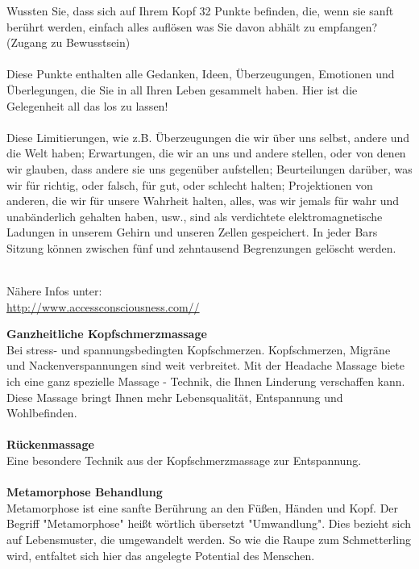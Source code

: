\documentclass[10pt,foldmark,notumble]{leaflet}
\begin{document}
Wussten Sie, dass sich auf Ihrem Kopf 32 Punkte befinden, die, wenn sie sanft berührt werden, einfach alles auflösen was Sie davon abhält zu empfangen? (Zugang zu Bewusstsein)\\
\\
Diese Punkte enthalten alle Gedanken, Ideen, Überzeugungen, Emotionen und Überlegungen, die Sie in all Ihren Leben gesammelt haben. Hier ist die Gelegenheit all das los zu lassen!\\
\\
Diese Limitierungen, wie z.B. Überzeugungen die wir über uns selbst, andere und die Welt haben; Erwartungen, die wir an uns und andere stellen, oder von denen wir glauben, dass andere sie uns gegenüber aufstellen; Beurteilungen darüber, was wir für richtig, oder falsch, für gut, oder schlecht halten; Projektionen von anderen, die wir für unsere Wahrheit halten, alles, was wir jemals für wahr und unabänderlich gehalten haben, usw., sind als verdichtete elektromagnetische Ladungen in unserem Gehirn und unseren Zellen gespeichert. In jeder Bars Sitzung können zwischen fünf und zehntausend Begrenzungen gelöscht werden.\\
\\
\vfill
\begin{center}
Nähere Infos unter:\\
{\url{http://www.accessconsciousness.com//}} \\
\end{center}
\vfill
\newpage
{\large \bf Ganzheitliche Kopfschmerzmassage}\\
Bei stress- und spannungsbedingten Kopfschmerzen. 
Kopfschmerzen, Migräne und Nackenverspannungen sind weit verbreitet. Mit der Headache Massage biete ich eine ganz spezielle Massage - Technik, die Ihnen Linderung verschaffen kann. Diese Massage bringt Ihnen mehr Lebensqualität, Entspannung und Wohlbefinden. \\
\\
{\large \bf Rückenmassage}\\
Eine besondere Technik aus der Kopfschmerzmassage zur Entspannung. \\
\\
{\large \bf Metamorphose Behandlung}\\
Metamorphose ist eine sanfte Berührung an den Füßen, Händen und Kopf. Der Begriff "Metamorphose" heißt wörtlich übersetzt "Umwandlung". Dies bezieht sich auf Lebensmuster, die umgewandelt werden. So wie die Raupe zum Schmetterling wird, entfaltet sich hier das angelegte Potential des Menschen. \\
\end{document}
